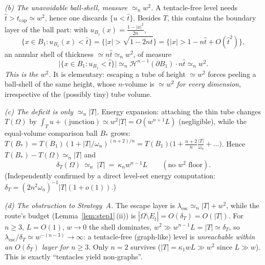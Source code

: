 \documentclass[11pt]{amsart}
\theoremstyle{definition}
\theoremstyle{remark}
\newcommand{\Om}{\Omega}
\newcommand{\Et}{E_{\hat t}}
\newcommand{\dT}{\delta_T}
\newcommand{\Hn}{\mathcal H^{n-1}}
\begin{document}
\emph{(b) The unavoidable ball-shell, measure $\simeq_n w^2$.}
A tentacle-free level needs $\hat t>t_{\mathrm{cap}}\simeq w^2$, hence one
discards $\{u<\hat t\}$. Besides $T$, this contains the boundary layer of the
ball part: with $u_{B_1}(x)=\tfrac{1-|x|^2}{2n}$,
\[
  \{x\in B_1:u_{B_1}(x)<\hat t\}=\{|x|>\sqrt{1-2n\hat t}\}
  =\{|x|>1-n\hat t+O(\hat t^2)\},
\]
an annular shell of thickness $\simeq n\hat t\simeq_n w^2$, of measure
\[
  \bigl|\{x\in B_1:u_{B_1}<\hat t\}\bigr|\simeq_n\Hn(\partial B_1)\cdot n\hat t
  \simeq_n w^2 .
\]
\emph{This is the $w^2$.} It is elementary: escaping a tube of height
$\simeq w^2$ forces peeling a ball-shell of the same height, whose
$n$-volume is $\simeq w^2$ \emph{for every dimension}, irrespective of the
(possibly tiny) tube volume.

\emph{(c) The deficit is only $\simeq_n|T|$.}
Energy expansion: attaching the thin tube changes $T(\Om)$ by
$\int_T u+(\text{junction})\simeq w^2|T|=O(w^{n+1}L)$ (negligible), while the
equal-volume comparison ball $B_*$ grows: $T(B_*)=T(B_1)(1+|T|/\omega_n)^{(n+2)/n}
=T(B_1)\bigl(1+\tfrac{n+2}{n}\tfrac{|T|}{\omega_n}+\dots\bigr)$. Hence
$T(B_*)-T(\Om)\simeq_n|T|$ and
\[
  \dT(\Om)\ \simeq_n\ |T|\ =\ \kappa_n w^{n-1}L \qquad(\text{no }w^2\text{ floor}).
\]
(Independently confirmed by a direct level-set energy computation:
$\dT=(2n^2\omega_n)^{-1}|T|(1+o(1))$.)

\emph{(d) The obstruction to Strategy~A.}
The escape layer is $\lambda_{\mathrm{esc}}\simeq_n|T|+w^2$, while the route's
budget (Lemma~\ref{lem:step1}\,(ii)) is $|\Om\setminus\Et|=O(\dT)=O(|T|)$. For
$n\ge3$, $L=O(1)$, $w\to0$ the shell dominates, $w^2\gg w^{n-1}L=|T|\simeq\dT$,
so $\lambda_{\mathrm{esc}}/\dT\simeq w^{-(n-3)}\to\infty$: a tentacle-free
(graph-like) level is \emph{unreachable within an $O(\dT)$ layer for $n\ge3$}.
Only $n=2$ survives ($|T|=\kappa_1 wL\gg w^2$ since $L\gg w$). This is exactly
``tentacles yield non-graphs''.
\end{document}
